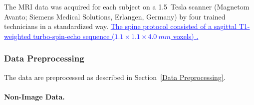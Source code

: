 \documentclass[journal]{style/vgtc} 			          %
\newcommand{\add}[1]{\textcolor{blue}{\uline{#1}}}
\begin{document}
The MRI data was acquired for each subject on a 1.5~Tesla scanner (Magnetom Avanto; Siemens Medical Solutions, Erlangen, Germany) by four trained technicians in a standardized way.
%
\add{The spine protocol consisted of a sagittal T1-weighted turbo-spin-echo sequence ($1.1\times1.1\times4.0~mm$ voxels) \cite{Hegenscheid2013}. %
}

\subsubsection{Data Preprocessing} \label{application:Data Preprocessing}
The data are preprocessed as described in Section~\ref{Data Preprocessing}.
%
\paragraph{Non-Image Data.} 
\end{document}
